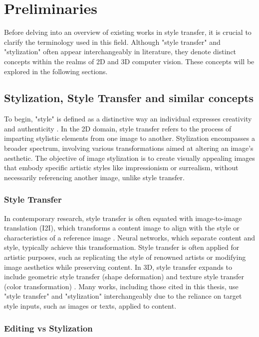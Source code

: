 \chapter{Preliminaries}
\label{chap:preliminaries}
Before delving into an overview of existing works in style transfer, it is crucial to clarify the terminology used in this field. Although "style transfer" and "stylization" often appear interchangeably in literature, they denote distinct concepts within the realms of 2D and 3D computer vision. These concepts will be explored in the following sections.

\section{Stylization, Style Transfer and similar concepts}

To begin, "style" is defined as a distinctive way an individual expresses creativity and authenticity \citep{Chen.2023}. In the 2D domain, style transfer refers to the process of imparting stylistic elements from one image to another. Stylization encompasses a broader spectrum, involving various transformations aimed at altering an image's aesthetic. The objective of image stylization is to create visually appealing images that embody specific artistic styles like impressionism or surrealism, without necessarily referencing another image, unlike style transfer.

\subsection{Style Transfer}

In contemporary research, style transfer is often equated with image-to-image translation (I2I), which transforms a content image to align with the style or characteristics of a reference image \citep{Pang.2021}. Neural networks, which separate content and style, typically achieve this transformation. Style transfer is often applied for artistic purposes, such as replicating the style of renowned artists or modifying image aesthetics while preserving content. In 3D, style transfer expands to include geometric style transfer (shape deformation) and texture style transfer (color transformation) \citep{Yin.2021}. Many works, including those cited in this thesis, use "style transfer" and "stylization" interchangeably due to the reliance on target style inputs, such as images or texts, applied to content.

\subsection{Editing vs Stylization}

